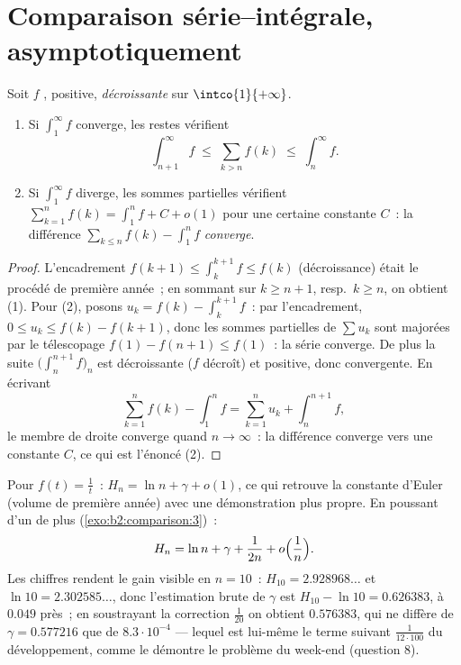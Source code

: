 \section{Comparaison série--intégrale, asymptotiquement}

\begin{theorem}\label{thm:b2:comparison:seriesintegral}
Soit $f$ , positive, \emph{décroissante} sur
$\intco{1}{+\infty}$.
\begin{enumerate}
  \item Si $\int_1^{\infty} f$ converge, les restes vérifient
        \[
        \int_{n+1}^{\infty} f \;\leq\; \sum_{k > n} f(k) \;\leq\;
        \int_{n}^{\infty} f .
        \]
  \item Si $\int_1^\infty f$ diverge, les sommes partielles vérifient
        $\sum_{k=1}^{n} f(k) = \int_1^n f + C + o(1)$ pour une
        certaine constante $C$~: la différence $\sum_{k \leq n} f(k) -
        \int_1^n f$ \emph{converge}.
\end{enumerate}
\end{theorem}

\begin{proof}
L'encadrement $f(k+1) \leq \int_k^{k+1} f \leq f(k)$ (décroissance)
était le procédé de première année~; en sommant sur $k \geq n+1$,
resp.\ $k \geq n$, on obtient (1). Pour (2), posons $u_k = f(k) -
\int_k^{k+1} f$~: par l'encadrement, $0 \leq u_k \leq f(k) - f(k+1)$,
donc les sommes partielles de $\sum u_k$ sont majorées par le
télescopage $f(1) - f(n+1) \leq f(1)$~: la série converge. De plus la
suite $\bigl(\int_n^{n+1} f\bigr)_n$ est décroissante ($f$ décroît) et
positive, donc convergente. En écrivant
\[
\sum_{k=1}^{n} f(k) - \int_1^n f
= \sum_{k=1}^{n} u_k + \int_n^{n+1} f ,
\]
le membre de droite converge quand $n \to \infty$~: la différence
converge vers une constante $C$, ce qui est l'énoncé (2).
\end{proof}

\begin{example}\label{ex:b2:comparison:harmonic}
Pour $f(t) = \frac1t$~: $H_n = \ln n + \gamma + o(1)$, ce qui retrouve
la constante d'Euler (volume de première année) avec une démonstration
plus propre. En poussant d'un  de plus
(\cref{exo:b2:comparison:3})~:
\[
H_n = \ln n + \gamma + \frac{1}{2n} + o\Bigl(\frac1n\Bigr).
\]
Les chiffres rendent le gain visible en $n = 10$~: $H_{10} =
2.928968\dots$ et $\ln 10 = 2.302585\dots$, donc l'estimation brute
de $\gamma$ est $H_{10} - \ln 10 = 0.626383$, à $0.049$ près~; en
soustrayant la correction $\frac1{20}$ on obtient $0.576383$, qui ne
diffère de $\gamma = 0.577216$ que de $8.3\cdot10^{-4}$ --- lequel est
lui-même le terme suivant $\frac{1}{12\cdot100}$ du développement,
comme le démontre le problème du week-end (question 8).
\end{example}

